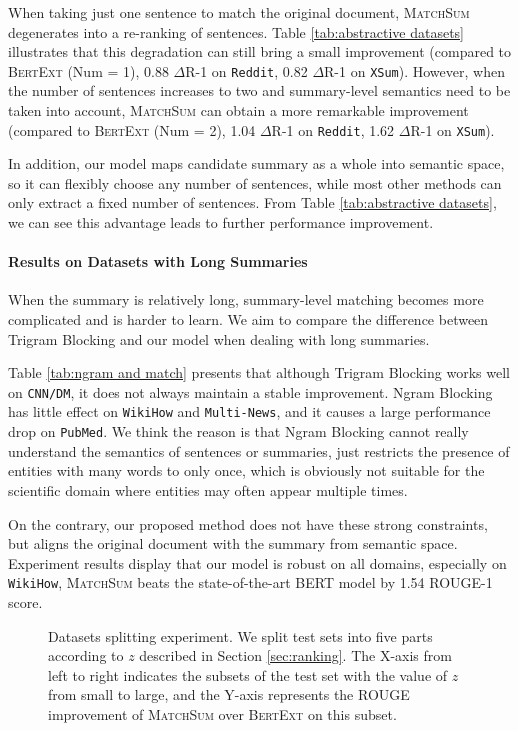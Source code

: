 When taking just one sentence to match the original document, \textsc{MatchSum} degenerates into a re-ranking of sentences. Table \ref{tab:abstractive datasets} illustrates that this degradation can still bring a small improvement (compared to \textsc{BertExt} (Num = 1),  0.88 $\Delta$R-1 on \texttt{Reddit}, 0.82 $\Delta$R-1 on \texttt{XSum}). However, when the number of sentences increases to two and summary-level semantics need to be taken into account, \textsc{MatchSum} can obtain a more remarkable improvement (compared to \textsc{BertExt} (Num = 2), 1.04 $\Delta$R-1 on \texttt{Reddit}, 1.62 $\Delta$R-1 on \texttt{XSum}).

In addition, our model maps candidate summary as a whole into semantic space, so it can flexibly choose any number of sentences, while most other methods can only extract a fixed number of sentences. From Table \ref{tab:abstractive datasets}, we can see this advantage leads to further performance improvement.

\paragraph{Results on Datasets with Long Summaries}
When the summary is relatively long, summary-level matching becomes more complicated and is harder to learn.
We aim to compare the difference between Trigram Blocking and our model when dealing with long summaries.

Table \ref{tab:ngram and match} presents that although Trigram Blocking works well on \texttt{CNN/DM}, it does not always maintain a stable improvement. Ngram Blocking has little effect on \texttt{WikiHow} and \texttt{Multi-News}, and it causes a large performance drop on \texttt{PubMed}. We think the reason is that Ngram Blocking cannot really understand the semantics of sentences or summaries, just restricts the presence of entities with many words to only once, which is obviously not suitable for the scientific domain where entities may often appear multiple times.

On the contrary, our proposed method does not have these strong constraints, but aligns the original document with the summary from semantic space. Experiment results display that our model is robust on all domains, especially on \texttt{WikiHow}, \textsc{MatchSum} beats the state-of-the-art BERT model by 1.54 ROUGE-1 score.

\begin{figure*}[t]
  \centering
 \caption{Datasets splitting experiment. We split test sets into five parts according to $z$ described in Section \ref{sec:ranking}. The X-axis from left to right indicates the subsets of the test set with the value of $z$ from small to large, and the Y-axis represents the ROUGE improvement of \textsc{MatchSum} over \textsc{BertExt} on this subset.}
 \label{fig:split}
\end{figure*}


